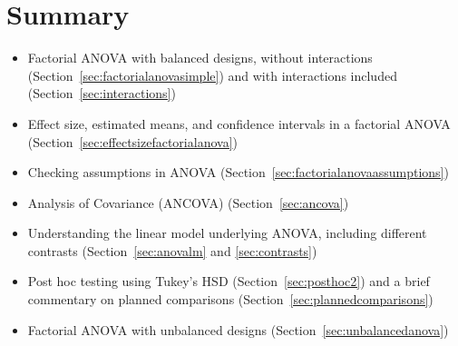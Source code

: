 \section{Summary}

\begin{itemize} \itemsep -2pt
\item Factorial ANOVA with balanced designs, without interactions (Section~\ref{sec:factorialanovasimple}) and with interactions included (Section~\ref{sec:interactions})
\item Effect size, estimated means, and confidence intervals in a factorial ANOVA (Section~\ref{sec:effectsizefactorialanova})
\item Checking assumptions in ANOVA (Section~\ref{sec:factorialanovaassumptions})
\item Analysis of Covariance (ANCOVA) (Section~\ref{sec:ancova})
\item Understanding the linear model underlying ANOVA, including different contrasts (Section~\ref{sec:anovalm} and \ref{sec:contrasts})
\item Post hoc testing using Tukey's HSD (Section~\ref{sec:posthoc2}) and a brief commentary on planned comparisons (Section~\ref{sec:plannedcomparisons})
\item Factorial ANOVA with unbalanced designs (Section~\ref{sec:unbalancedanova})
\end{itemize}


